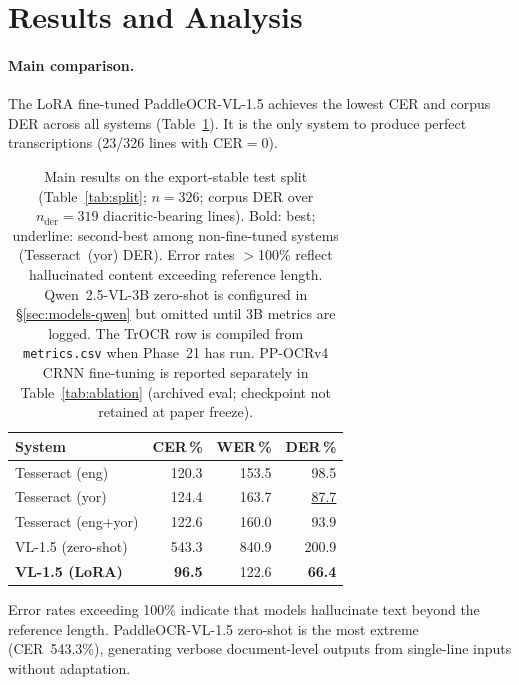 \documentclass{article}
\begin{document}
\section{Results and Analysis}

\paragraph{Main comparison.}
The LoRA fine-tuned PaddleOCR-VL-1.5 achieves the lowest CER and corpus DER across all systems (Table~\ref{tab:main}). It is the only system to produce perfect transcriptions (23/326 lines with CER${=}0$).

\begin{table}[t]
  \centering
  \small
  \begin{tabular}{lrrr}
    \toprule
    System & CER\,\% & WER\,\% & DER\,\% \\
    \midrule
    Tesseract (eng) & 120.3 & 153.5 & 98.5 \\
    Tesseract (yor) & 124.4 & 163.7 & \underline{87.7} \\
    Tesseract (eng+yor) & 122.6 & 160.0 & 93.9 \\
    VL-1.5 (zero-shot) & 543.3 & 840.9 & 200.9 \\
    \textbf{VL-1.5 (LoRA)} & \textbf{96.5} & 122.6 & \textbf{66.4} \\
    \bottomrule
  \end{tabular}
  \caption{Main results on the export-stable test split (Table~\ref{tab:split}; $n{=}326$; corpus DER over $n_{\mathrm{der}}{=}319$ diacritic-bearing lines). Bold: best; underline: second-best among non-fine-tuned systems (Tesseract~(yor) DER). Error rates $>$100\% reflect hallucinated content exceeding reference length. Qwen~2.5-VL-3B zero-shot is configured in \S\ref{sec:models-qwen} but omitted until 3B metrics are logged. The TrOCR row is compiled from \texttt{metrics.csv} when Phase~21 has run. PP-OCRv4 CRNN fine-tuning is reported separately in Table~\ref{tab:ablation} (archived eval; checkpoint not retained at paper freeze).}
  \label{tab:main}
\end{table}

Error rates exceeding 100\% indicate that models hallucinate text beyond the reference length. PaddleOCR-VL-1.5 zero-shot is the most extreme (CER~543.3\%), generating verbose document-level outputs from single-line inputs without adaptation.
\end{document}
